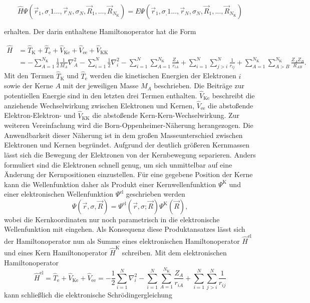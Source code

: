\begin{equation}
  \hat{H}\Psi(\vec{r}_1,\sigma_,1\dotsc,\vec{r}_N,\sigma_N,\vec{R}_1,\dotsc,\vec{R}_{N_{\text{K}}})=E\Psi(\vec{r}_1,\sigma_,1\dotsc,\vec{r}_N,\sigma_N,\vec{R}_1,\dotsc,\vec{R}_{N_{\text{K}}})
\end{equation}

erhalten. Der darin enthaltene Hamiltonoperator hat die Form

\begin{equation}
\begin{aligned}
  \hat{H}&=\hat{T}_{\text{K}}+\hat{T}_{\text{e}}+\hat{V}_{\text{Ke}}+\hat{V}_{\text{ee}}+\hat{V}_{\text{KK}}\\
  &=-\sum_{A=1}^{N_\text{K}}\frac{1}{2}\frac{1}{M_A}\nabla^2_A-\sum_{i=1}^N\frac{1}{2}\nabla^2_i-\sum_{i=1}^N\sum_{A=1}^{N_\text{K}}\frac{Z_A}{r_{iA}}+\sum_{i=1}^N\sum_{j>i}^N\frac{1}{r_{ij}}+\sum_{A=1}^{N_\text{K}}\sum_{A>B}^{N_\text{K}}\frac{Z_AZ_B}{R_{AB}}.
\end{aligned}
\end{equation}
Mit den Termen $\hat{T}_{\text{K}}$ und $\hat{T}_{\text{e}}$ werden die kinetischen Energien der Elektronen $i$ sowie der Kerne $A$ mit der jeweiligen Masse $M_A$ beschrieben. Die Beiträge zur potentiellen Energie sind in den letzten drei Termen enthalten. $\hat{V}_{\text{Ke}}$ beschreibt die anziehende Wechselwirkung zwischen Elektronen und Kernen, $\hat{V}_{\text{ee}}$ die abstoßende Elektron-Elektron- und $\hat{V}_{\text{KK}}$ die abstoßende Kern-Kern-Wechselwirkung.
Zur weiteren Vereinfachung wird die Born-Oppenheimer-Näherung\supercite{born1927quantentheorie} herangezogen. Die Anwendbarkeit dieser Näherung ist in dem großen Masseunterschied zwischen Elektronen und Kernen begründet. Aufgrund der deutlich größeren Kernmassen lässt sich die Bewegung der Elektronen von der Kernbewegung separieren. Anders formuliert sind die Elektronen schnell genug, um sich unmittelbar auf eine Änderung der Kernpositionen einzustellen. Für eine gegebene Position der Kerne kann die Wellenfunktion daher als Produkt einer Kernwellenfunktion $\Psi^{\text{K}}$ und einer elektronischen Wellenfunktion $\Psi^{\text{el}}$ geschrieben werden
\begin{equation}
\Psi(\vec{r},\sigma,\vec{R})=\Psi^{\text{el}}(\vec{r},\sigma;\vec{R})\Psi^{\text{K}}(\vec{R}),
\end{equation}
wobei die Kernkoordinaten nur noch parametrisch in die elektronische Wellenfunktion mit eingehen. Als Konsequenz diese Produktansatzes lässt sich der Hamiltonoperator nun als Summe eines elektronischen Hamiltonoperator $\hat{H}^{\text{el}}$ und eines Kern Hamiltonoperator $\hat{H}^{\text{K}}$ schreiben. Mit dem elektronischen Hamiltonoperator
\begin{equation}\label{eq:elhamilton}
  \hat{H}^{\text{el}}=\hat{T}_{\text{e}}+\hat{V}_{\text{Ke}}+\hat{V}_{\text{ee}}=-\frac{1}{2}\sum_{i=1}^N\nabla^2_i-\sum_{i=1}^N\sum_{A=1}^{N_\text{K}}\frac{Z_A}{r_{iA}}+\sum_{i=1}^N\sum_{j>i}^N\frac{1}{r_{ij}}
\end{equation}
kann schließlich die elektronische Schrödingergleichung 

